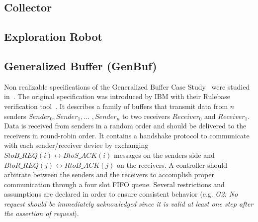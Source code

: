 %

\subsection{Collector}

\subsection{Exploration Robot}

\subsection{Generalized Buffer (GenBuf)}
Non realizable specifications of the Generalized Buffer Case Study~\cite{DBLP:journals/entcs/BloemGJPPW07} were studied in~\cite{DBLP:conf/fmcad/KonighoferHB09}.  
The original specification was introduced by 
IBM with their Rulebase verification tool~\cite{beer1996rulebase}.
It describes a family of buffers that transmit data from $n$ senders
$Sender_0,Sender_1$$,\ldots$ $,Sender_n$ to two receivers $Receiver_0$ and
$Receiver_1$.  Data is received from senders in a random order and should be
delivered to the receivers in round-robin order.  
It contains a handshake protocol to communicate with each sender/receiver device
by exchanging $StoB\_REQ(i) \leftrightarrow BtoS\_ACK(i)$ messages on the senders side
and $BtoR\_REQ(j) \leftrightarrow RtoB\_ACK(j)$ on the receivers.  
A controller should arbitrate between the senders and the receivers to
accomplish proper communication through a four slot FIFO queue.
Several restrictions and assumptions are declared in order
to ensure consistent behavior (e.g. \emph{G2: No request should be immediately
acknowledged since it is valid at least one step 
after the assertion of request}).\\

